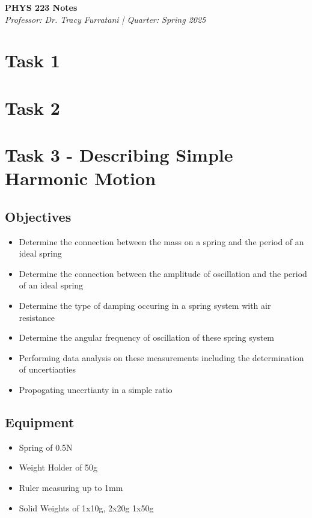 \documentclass[12pt]{article}
\begin{document}
\begin{center}
    {\LARGE \textbf{PHYS 223 Notes}} \\
    \vspace{0.5em}
    {\large \textit{Professor: Dr. Tracy Furratani \quad | \quad Quarter: Spring 2025}} \\
    \vspace{0.5em}
\end{center}

\tableofcontents
\newpage


\section{Task 1}

\section{Task 2}

\section{Task 3 - Describing Simple Harmonic Motion}
\subsection{Objectives}
\begin{itemize}
\item Determine the connection between the mass on a spring and the period of an ideal spring
\item Determine the connection between the amplitude of oscillation and the period of an ideal spring
\item Determine the type of damping occuring in a spring system with air resistance
\item Determine the angular frequency of oscillation of these spring system
\item Performing data analysis on these measurements including the determination of uncertianties
\item Propogating uncertianty in a simple ratio
\end{itemize}
\subsection{Equipment}
\begin{itemize}
    \item Spring of 0.5N
    \item Weight Holder of 50g
    \item Ruler measuring up to 1mm
    \item Solid Weights of 1x10g, 2x20g 1x50g
\end{itemize}
\end{document}
